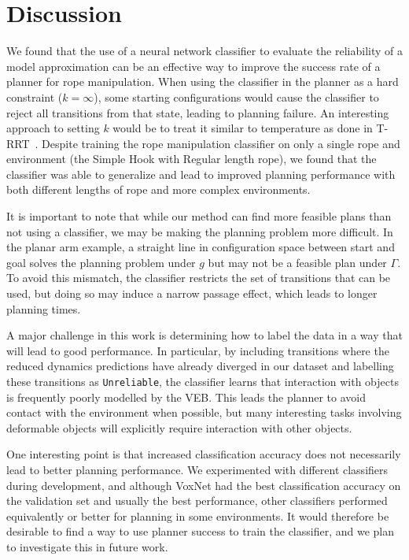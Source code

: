 \section{Discussion}
\label{sec:discussion}


We found that the use of a neural network classifier to evaluate the reliability of a model approximation can be an effective way to improve the success rate of a planner for rope manipulation. When using the classifier in the planner as a hard constraint ($k = \infty$), some starting configurations would cause the classifier to reject all transitions from that state, leading to planning failure. An interesting approach to setting $k$ would be to treat it similar to temperature as done in T-RRT~\cite{Jaillet2008transition}. Despite training the rope manipulation classifier on only a single rope and environment (the Simple Hook with Regular length rope), we found that the classifier was able to generalize and lead to improved planning performance with both different lengths of rope and more complex environments. %

It is important to note that while our method can find more feasible plans than not using a classifier, we may be making the planning problem more difficult. In the planar arm example, a straight line in configuration space between start and goal solves the planning problem under $g$ but may not be a feasible plan under $\Gamma$. To avoid this mismatch, the classifier restricts the set of transitions that can be used, but doing so may induce a narrow passage effect, which leads to longer planning times.

A major challenge in this work is determining how to label the data in a way that will lead to good performance. In particular, by including transitions where the reduced dynamics predictions have already diverged in our dataset and labelling these transitions as \texttt{Unreliable}, the classifier learns that interaction with objects is frequently poorly modelled by the VEB. This leads the planner to avoid contact with the environment when possible, but many interesting tasks involving deformable objects will explicitly require interaction with other objects.

One interesting point is that increased classification accuracy does not necessarily lead to better planning performance. We experimented with different classifiers during development, and although VoxNet had the best classification accuracy on the validation set and usually the best performance, other classifiers performed equivalently or better for planning in some environments. It would therefore be desirable to find a way to use planner success to train the classifier, and we plan to investigate this in future work.

